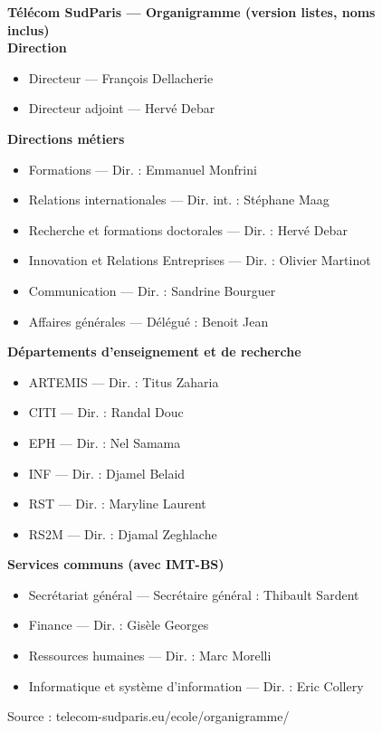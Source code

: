 



\begin{figure}[ht]
\small
\noindent\textbf{T\'el\'ecom SudParis — Organigramme (version listes, noms inclus)}\\[2pt]

\textbf{Direction}
\begin{itemize}\itemsep2pt
  \item Directeur — Fran\c{c}ois Dellacherie
  \item Directeur adjoint — Herv\'e Debar
\end{itemize}

\textbf{Directions m\'etiers}
\begin{itemize}\itemsep2pt
  \item Formations — Dir. : Emmanuel Monfrini
  \item Relations internationales — Dir. int. : St\'ephane Maag
  \item Recherche et formations doctorales — Dir. : Herv\'e Debar
  \item Innovation et Relations Entreprises — Dir. : Olivier Martinot
  \item Communication — Dir. : Sandrine Bourguer
  \item Affaires g\'en\'erales — D\'el\'egu\'e : Benoit Jean
\end{itemize}

\textbf{D\'epartements d'enseignement et de recherche}
\begin{itemize}\itemsep2pt
  \item ARTEMIS — Dir. : Titus Zaharia 
  \item CITI — Dir. : Randal Douc
  \item EPH — Dir. : Nel Samama 
  \item INF — Dir. : Djamel Belaid
  \item RST — Dir. : Maryline Laurent 
  \item RS2M — Dir. : Djamal Zeghlache
\end{itemize}

\textbf{Services communs (avec IMT-BS)}
\begin{itemize}\itemsep2pt
  \item Secr\'etariat g\'en\'eral — Secr\'etaire g\'en\'eral : Thibault Sardent
  \item Finance — Dir. : Gis\`ele Georges
  \item Ressources humaines — Dir. : Marc Morelli
  \item Informatique et syst\`eme d'information — Dir. : Eric Collery
\end{itemize}

\footnotesize Source : telecom-sudparis{.}eu/ecole/organigramme/
\end{figure}
